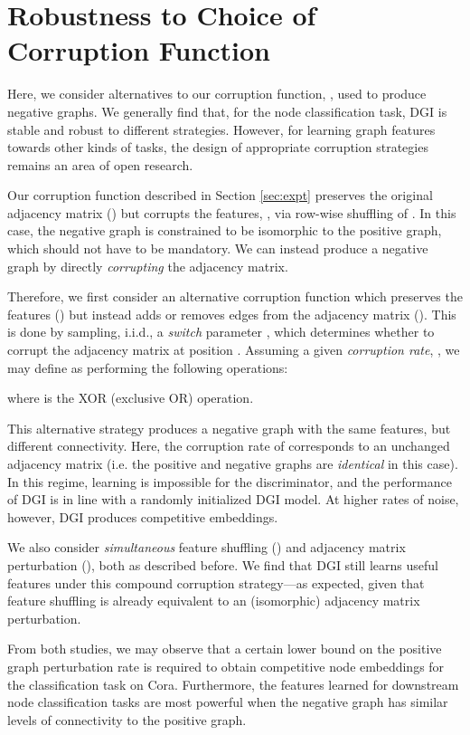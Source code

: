 \documentclass{article} \usepackage{iclr2019_conference,times}
\begin{document}
\section{Robustness to Choice of Corruption Function}\label{app: corruption}
Here, we consider alternatives to our corruption function, , used to produce negative graphs. We generally find that, for the node classification task, DGI is stable and robust to different strategies. However, for learning graph features towards other kinds of tasks, the design of appropriate corruption strategies remains an area of open research.  

Our corruption function described in Section \ref{sec:expt} preserves the original adjacency matrix () but corrupts the features, , via row-wise shuffling of . In this case, the negative graph is constrained to be isomorphic to the positive graph, which should not have to be mandatory. We can instead produce a negative graph by directly \emph{corrupting} the adjacency matrix.  

Therefore, we first consider an alternative corruption function  which preserves the features () but instead adds or removes edges from the adjacency matrix (). This is done by sampling, i.i.d., a \emph{switch} parameter , which determines whether to corrupt the adjacency matrix at position . Assuming a given \emph{corruption rate}, , we may define  as performing the following operations:

where  is the XOR (exclusive OR) operation.

This alternative strategy produces a negative graph with the same features, but different connectivity.  Here, the corruption rate of  corresponds to an unchanged adjacency matrix (i.e. the positive and negative graphs are \emph{identical} in this case). In this regime, learning is impossible for the discriminator, and the performance of DGI is in line with a randomly initialized DGI model. At higher rates of noise, however, DGI produces competitive embeddings.

We also consider \textit{simultaneous} feature shuffling () and adjacency matrix perturbation (), both as described before. We find that DGI still learns useful features under this compound corruption strategy---as expected, given that feature shuffling is already equivalent to an (isomorphic) adjacency matrix perturbation.

From both studies, we may observe that a certain lower bound on the positive graph perturbation rate is required to obtain competitive node embeddings for the classification task on Cora. Furthermore, the features learned for downstream node classification tasks are most powerful when the negative graph has similar levels of connectivity to the positive graph. 
\end{document}
